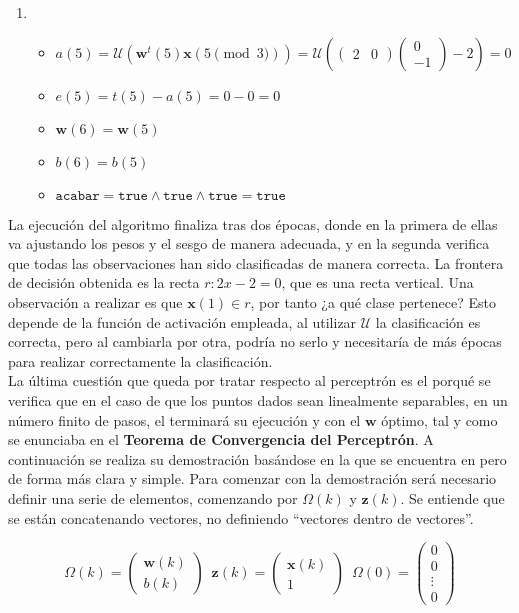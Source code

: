 \begin{enumerate}[label = \textbf{\arabic*. }]
			\item \begin{itemize}
				\item $a(5) = \mathcal{U}(\textbf{w}^t(5)\textbf{x}(5\pmod{3})) = \mathcal{U}\left(\begin{pmatrix}2 & 0\end{pmatrix}\begin{pmatrix}
					0\\-1 \end{pmatrix} -2\right) = 0$
				\item $e(5) = t(5) - a(5) = 0 - 0 = 0$
				\item $\textbf{w}(6) = \textbf{w}(5)$
				\item $b(6) = b(5)$
				\item $\texttt{acabar} = \texttt{true} \land \texttt{true} \land \texttt{true} = \texttt{true}$
			\end{itemize}
		\end{enumerate}
		
		La ejecución del algoritmo finaliza tras dos épocas, donde en la primera de ellas va ajustando los pesos y el sesgo de manera adecuada, y en la segunda verifica que todas las observaciones han sido clasificadas de manera correcta. La frontera de decisión obtenida es la recta $r: 2x - 2 = 0$, que es una recta vertical. Una observación a realizar es que $\textbf{x}(1) \in r$, por tanto ¿a qué clase pertenece? Esto depende de la función de activación empleada, al utilizar $\mathcal{U}$ la clasificación es correcta, pero al cambiarla por otra, podría no serlo y necesitaría de más épocas para realizar correctamente la clasificación. \\
		
		La última cuestión que queda por tratar respecto al perceptrón es el porqué se verifica que en el caso de que los puntos dados sean linealmente separables, en un número finito de pasos, el  terminará su ejecución y con el $\textbf{w}$ óptimo, tal y como se enunciaba en el \textbf{Teorema de Convergencia del Perceptrón}. A continuación se realiza su demostración basándose en la que se encuentra en \cite{nndesign} pero de forma más clara y simple. Para comenzar con la demostración será necesario definir una serie de elementos, comenzando por $\Omega(k)$ y $\textbf{z}(k)$. Se entiende que se están concatenando vectores, no definiendo ``vectores dentro de vectores''. 
		
		$$
		\Omega(k) = \begin{pmatrix}
			\textbf{w}(k)\\
			b(k)
		\end{pmatrix} \,\,\, \textbf{z}(k) = \begin{pmatrix}
		\textbf{x}(k)\\
		1
		\end{pmatrix}
		 \,\,\, \Omega(0) = \begin{pmatrix}
			0\\0\\\vdots\\0
		\end{pmatrix}
		$$
		
